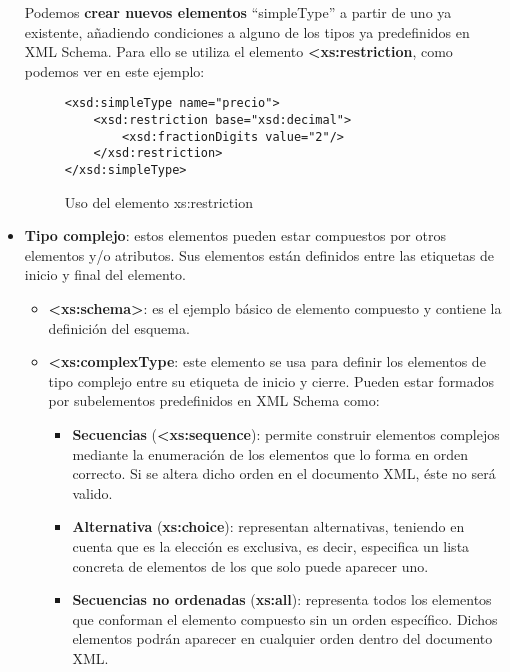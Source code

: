 \begin{itemize}
    Podemos \textbf{crear nuevos elementos} ``simpleType'' a partir de uno ya existente, añadiendo condiciones a alguno de los tipos ya predefinidos en XML Schema. Para ello se utiliza el elemento \textbf{<xs:restriction}, como podemos ver en este ejemplo:

    \begin{figure}[h]
        \begin{tcolorbox}[sharp corners, colback=yellow!30, colframe=white!20]
            \scriptsize
            \begin{verbatim}
<xsd:simpleType name="precio">
    <xsd:restriction base="xsd:decimal">
        <xsd:fractionDigits value="2"/>
    </xsd:restriction>
</xsd:simpleType>
            \end{verbatim}
        \end{tcolorbox}
        \caption{Uso del elemento xs:restriction}
    \end{figure}

    \item \textbf{Tipo complejo}: estos elementos pueden estar compuestos por otros elementos y/o atributos. Sus elementos están definidos entre las etiquetas de inicio y final del elemento.

    \begin{itemize}
        \item \textbf{<xs:schema>}: es el ejemplo básico de elemento compuesto y contiene la definición del esquema.

        \item \textbf{<xs:complexType}: este elemento se usa para definir los elementos de tipo complejo entre su etiqueta de inicio y cierre. Pueden estar formados por subelementos predefinidos en XML Schema como:

        \begin{itemize}
            \item \textbf{Secuencias} (\textbf{<xs:sequence}): permite construir elementos complejos mediante la enumeración de los elementos que lo forma en orden correcto.  Si se altera dicho orden en el documento XML, éste no será valido.

            \item \textbf{Alternativa} (\textbf{xs:choice}): representan alternativas, teniendo en cuenta que es la elección es exclusiva, es decir, especifica un lista concreta de elementos de los que solo puede aparecer uno.

            \item \textbf{Secuencias no ordenadas} (\textbf{xs:all}): representa todos los elementos que conforman el elemento compuesto sin un orden específico. Dichos elementos podrán aparecer en cualquier orden dentro del documento XML.


\end{itemize}
\end{itemize}
\end{itemize}
